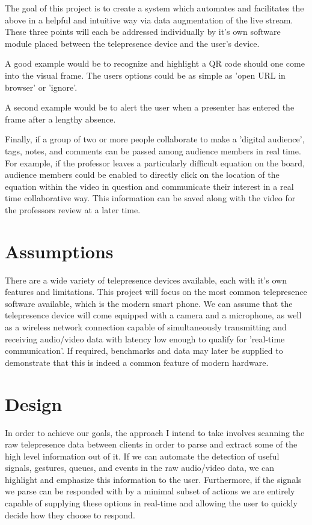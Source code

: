 \documentclass[a4paper,12pt]{report}
\begin{document}
The goal of this project is to create a system which automates and facilitates the above in a helpful and intuitive way via data augmentation of the live stream. These three points will each be addressed individually by it's own software module placed between the telepresence device and the user's device.

A good example would be to recognize and highlight a QR code should one come into the visual frame. The users options could be as simple as 'open URL in browser' or 'ignore'.

A second example would be to alert the user when a presenter has entered the frame after a lengthy absence.

Finally, if a group of two or more people collaborate to make a 'digital audience', tags, notes, and comments can be passed among audience members in real time. For example, if the professor leaves a particularly difficult equation on the board, audience members could be enabled to directly click on the location of the equation within the video in question and communicate their interest in a real time collaborative way. This information can be saved along with the video for the professors review at a later time.

\section{Assumptions}

There are a wide variety of telepresence devices available, each with it's own features and limitations. This project will focus on the most common telepresence software available, which is the modern smart phone. We can assume that the telepresence device will come equipped with a camera and a microphone, as well as a wireless network connection capable of simultaneously transmitting and receiving audio/video data with latency low enough to qualify for 'real-time communication'. If required, benchmarks and data may later be supplied to demonstrate that this is indeed a common feature of modern hardware.

\section{Design}

In order to achieve our goals, the approach I intend to take involves scanning the raw telepresence data between clients in order to parse and extract some of the high level information out of it. If we can automate the detection of useful signals, gestures, queues, and events in the raw audio/video data, we can highlight and emphasize this information to the user. Furthermore, if the signals we parse can be responded with by a minimal subset of actions we are entirely capable of supplying these options in real-time and allowing the user to quickly decide how they choose to respond.
 
\end{document}
